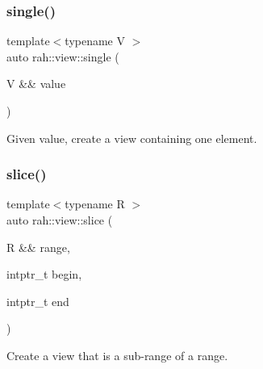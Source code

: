 \subsubsection{\texorpdfstring{single()}{single()}}
{\footnotesize\ttfamily template$<$typename V $>$ \\
auto rah\+::view\+::single (\begin{DoxyParamCaption}\item[{V \&\&}]{value }\end{DoxyParamCaption})}



Given value, create a view containing one element. 


\begin{DoxyCodeInclude}{0}
\end{DoxyCodeInclude}
\mbox{\label{namespacerah_1_1view_a419374b95b3b9601655b0edf753963c3}} 
\subsubsection{\texorpdfstring{slice()}{slice()}\hspace{0.1cm}{\footnotesize\ttfamily [1/2]}}
{\footnotesize\ttfamily template$<$typename R $>$ \\
auto rah\+::view\+::slice (\begin{DoxyParamCaption}\item[{R \&\&}]{range,  }\item[{intptr\+\_\+t}]{begin,  }\item[{intptr\+\_\+t}]{end }\end{DoxyParamCaption})}



Create a view that is a sub-\/range of a range. 


